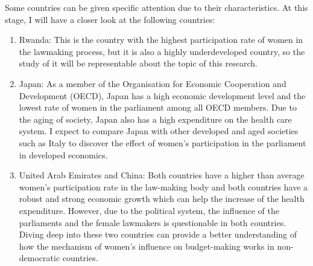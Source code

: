 \documentclass[12pt]{article}
\begin{document}
Some countries can be given specific attention due to their characteristics. 
At this stage, I will have a closer look at the following countries:
\begin{enumerate}
	\item Rwanda: This is the country with the highest participation rate of women in the lawmaking process, but it is also a highly underdeveloped country, so the study of it will be representable about the topic of this research.
	\item Japan: As a member of the Organisation for Economic Cooperation and Development (OECD), Japan has a high economic development level and the lowest rate of women in the parliament among all OECD members. Due to the aging of society, Japan also has a high expenditure on the health care system. I expect to compare Japan with other developed and aged societies such as Italy to discover the effect of women's participation in the parliament in developed economics.
	\item United Arab Emirates and China: Both countries have a higher than average women's participation rate in the law-making body and both countries have a robust and strong economic growth which can help the increase of the health expenditure. However, due to the political system, the influence of the parliaments and the female lawmakers is questionable in both countries. Diving deep into these two countries can provide a better understanding of how the mechanism of women's influence on budget-making works in non-democratic countries. 
\end{enumerate}



\newpage


\end{document}
